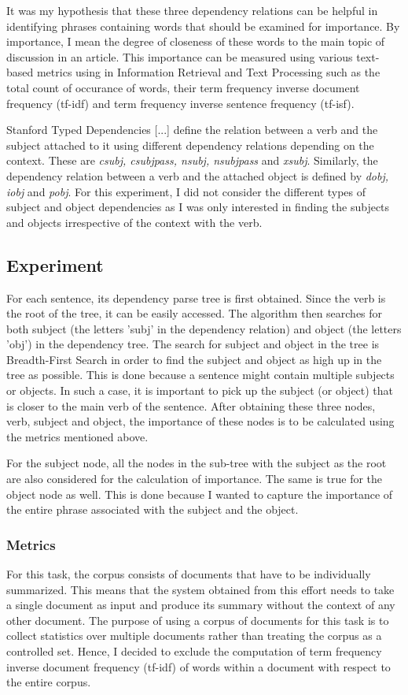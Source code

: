 It was my hypothesis that these three dependency relations can be helpful in identifying phrases containing words that should be examined for importance.
By importance, I mean the degree of closeness of these words to the main topic of discussion in an article.
This importance can be measured using various text-based metrics using in Information Retrieval and Text Processing such as the total count of occurance of words, their term frequency inverse document frequency (tf-idf) and term frequency inverse sentence frequency (tf-isf).

Stanford Typed Dependencies [...] define the relation between a verb and the subject attached to it using different dependency relations depending on the context. These are \textit{csubj, csubjpass, nsubj, nsubjpass} and \textit{xsubj}.
Similarly, the dependency relation between a verb and the attached object is defined by \textit{dobj, iobj} and \textit{pobj}.
For this experiment, I did not consider the different types of subject and object dependencies as I was only interested in finding the subjects and objects irrespective of the context with the verb.

\subsection{Experiment}
For each sentence, its dependency parse tree is first obtained.
Since the verb is the root of the tree, it can be easily accessed.
The algorithm then searches for both subject (the letters 'subj' in the dependency relation) and object (the letters 'obj') in the dependency tree.
The search for subject and object in the tree is Breadth-First Search in order to find the subject and object as high up in the tree as possible.
This is done because a sentence might contain multiple subjects or objects.
In such a case, it is important to pick up the subject (or object) that is closer to the main verb of the sentence.
After obtaining these three nodes, verb, subject and object, the importance of these nodes is to be calculated using the metrics mentioned above.

For the subject node, all the nodes in the sub-tree with the subject as the root are also considered for the calculation of importance.
The same is true for the object node as well.
This is done because I wanted to capture the importance of the entire phrase associated with the subject and the object.

\subsubsection*{Metrics}
For this task, the corpus consists of documents that have to be individually summarized.
This means that the system obtained from this effort needs to take a single document as input and produce its summary without the context of any other document.
The purpose of using a corpus of documents for this task is to collect statistics over multiple documents rather than treating the corpus as a controlled set.
Hence, I decided to exclude the computation of term frequency inverse document frequency (tf-idf) of words within a document with respect to the entire corpus.

